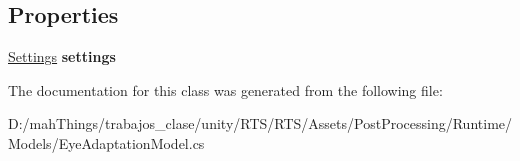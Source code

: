 \subsection*{Properties}
\begin{DoxyCompactItemize}
\item 
\mbox{\label{class_unity_engine_1_1_post_processing_1_1_eye_adaptation_model_ad90e61c36b7832a43da25e407c045dc4}} 
\mbox{\hyperlink{struct_unity_engine_1_1_post_processing_1_1_eye_adaptation_model_1_1_settings}{Settings}} {\bfseries settings}
\end{DoxyCompactItemize}


The documentation for this class was generated from the following file\+:\begin{DoxyCompactItemize}
\item 
D\+:/mah\+Things/trabajos\+\_\+clase/unity/\+R\+T\+S/\+R\+T\+S/\+Assets/\+Post\+Processing/\+Runtime/\+Models/Eye\+Adaptation\+Model.\+cs\end{DoxyCompactItemize}

